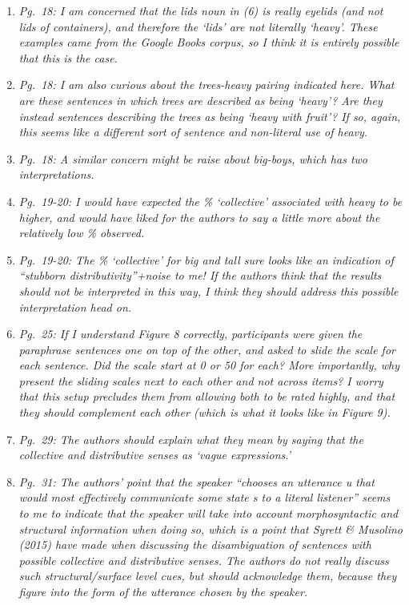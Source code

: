 \documentclass[12pt]{article}
\begin{document}
\begin{enumerate}
\item \emph{Pg.~18: I am concerned that the \emph{lids} noun in (6) is really eyelids (and not lids of containers), and therefore the `lids' are not literally ‘heavy’. These examples came from the Google Books corpus, so I think it is entirely possible that this is the case.}

\item \emph{Pg.~18: I am also curious about the \emph{trees-heavy} pairing indicated here. What are these sentences in which trees are described as being `heavy'? Are they instead sentences describing the trees as being `heavy with fruit'? If so, again, this seems like a different sort of sentence and non-literal use of heavy.}

\item \emph{Pg.~18: A similar concern might be raise about \emph{big-boys}, which has two interpretations.}

\item \emph{Pg.~19-20: I would have expected the \% `collective' associated with \emph{heavy} to be higher, and would have liked for the authors to say a little more about the relatively low \% observed.}
	
\item \emph{Pg.~19-20: The \% `collective' for \emph{big} and \emph{tall} sure looks like an indication of “stubborn distributivity”+noise to me! If the authors think that the results should not be interpreted in this way, I think they should address this possible interpretation head on.}

\item \emph{Pg.~25: If I understand Figure 8 correctly, participants were given the paraphrase sentences one on top of the other, and asked to slide the scale for each sentence. Did the scale start at 0 or 50 for each? More importantly, why present the sliding scales next to each other and not across items? I worry that this setup precludes them from allowing both to be rated highly, and that they should complement each other (which is what it looks like in Figure 9).}

\item \emph{Pg.~29: The authors should explain what they mean by saying that the collective and distributive senses as `vague expressions.'}

\item \emph{Pg.~31: The authors' point that the speaker ``chooses an utterance u that would most effectively communicate some state s to a literal listener'' seems to me to indicate that the speaker will take
into account morphosyntactic and structural information when doing so, which is a point that Syrett \& Musolino (2015) have made when discussing the disambiguation of sentences with possible collective and distributive senses. The authors do not really discuss such structural/surface level cues, but should acknowledge them, because they figure into the form of the utterance chosen by the speaker.}


\end{enumerate}
\end{document}
